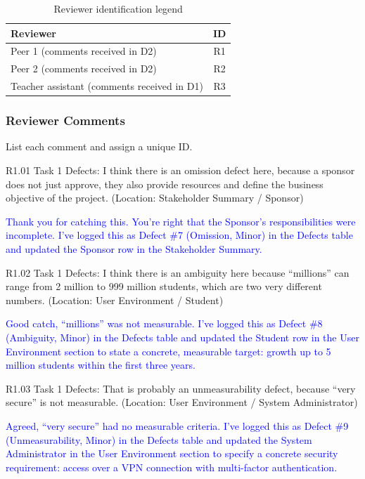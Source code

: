 \documentclass[10pt,letterpaper]{article}
\begin{document}
\begin{table}[h!]
\centering
\caption{Reviewer identification legend}
\label{tab:reviewer-ids}
\begin{tabularx}{\textwidth}{|X|c|}
\hline
\textbf{Reviewer} & \textbf{ID} \\
\hline
Peer 1 (comments received in D2) & R1 \\
\hline
Peer 2 (comments received in D2) & R2 \\
\hline
Teacher assistant (comments received in D1) & R3 \\
\hline
\end{tabularx}
\end{table}

\subsubsection*{Reviewer Comments}

List each comment and assign a unique ID.

R1.01 Task 1 Defects: I think there is an omission defect here, because a sponsor does not just approve, they also provide resources and define the business objective of the project. (Location: Stakeholder Summary / Sponsor)

\textcolor{blue}{Thank you for catching this. You're right that the Sponsor's responsibilities were incomplete. I've logged this as Defect \#7 (Omission, Minor) in the Defects table and updated the Sponsor row in the Stakeholder Summary.}


R1.02 Task 1 Defects: I think there is an ambiguity here because ``millions'' can range from 2 million to 999 million students, which are two very different numbers. (Location: User Environment / Student)

\textcolor{blue}{Good catch, ``millions'' was not measurable. I've logged this as Defect \#8 (Ambiguity, Minor) in the Defects table and updated the Student row in the User Environment section to state a concrete, measurable target: growth up to 5 million students within the first three years.}

R1.03 Task 1 Defects: That is probably an unmeasurability defect, because ``very secure'' is not measurable. (Location: User Environment / System Administrator)

\textcolor{blue}{Agreed, ``very secure'' had no measurable criteria. I've logged this as Defect \#9 (Unmeasurability, Minor) in the Defects table and updated the System Administrator in the User Environment section to specify a concrete security requirement: access over a VPN connection with multi-factor authentication.}
\end{document}
